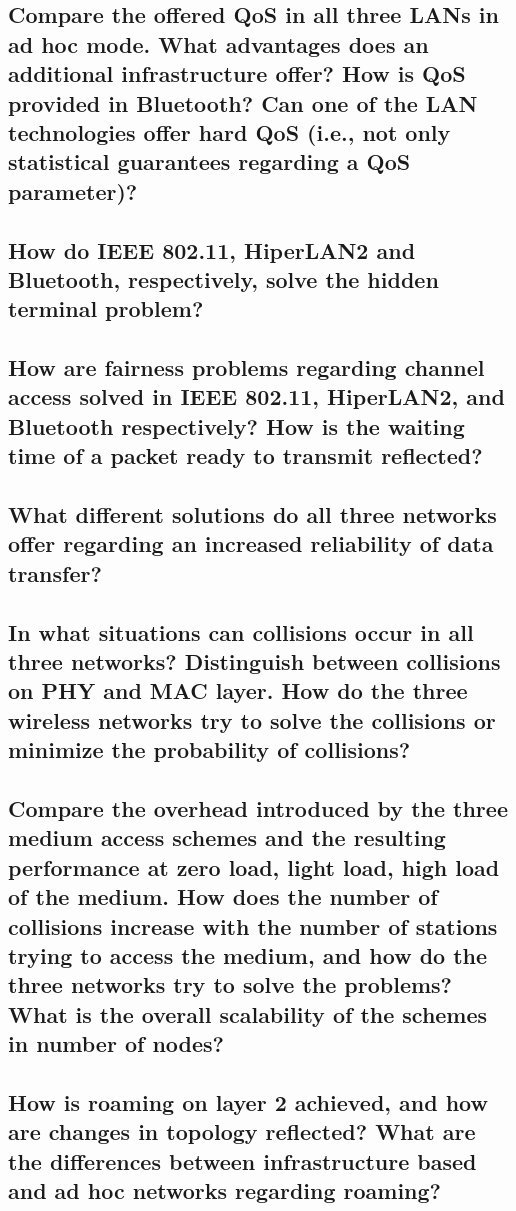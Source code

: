 \subsection{Compare the offered QoS in all three LANs in ad hoc mode. What advantages does
an additional infrastructure offer? How is QoS provided in Bluetooth? Can one of the
LAN technologies offer hard QoS (i.e., not only statistical guarantees regarding a
QoS parameter)?}

\subsection{How do IEEE 802.11, HiperLAN2 and Bluetooth, respectively, solve the hidden
terminal problem?}

\subsection{How are fairness problems regarding channel access solved in IEEE 802.11,
HiperLAN2, and Bluetooth respectively? How is the waiting time of a packet ready to
transmit reflected?}

\subsection{What different solutions do all three networks offer regarding an increased reliability
of data transfer?}

\subsection{In what situations can collisions occur in all three networks? Distinguish between
collisions on PHY and MAC layer. How do the three wireless networks try to solve the
collisions or minimize the probability of collisions?}

\subsection{Compare the overhead introduced by the three medium access schemes and the
resulting performance at zero load, light load, high load of the medium. How does the
number of collisions increase with the number of stations trying to access the
medium, and how do the three networks try to solve the problems? What is the
overall scalability of the schemes in number of nodes?}

\subsection{How is roaming on layer 2 achieved, and how are changes in topology reflected?
What are the differences between infrastructure based and ad hoc networks
regarding roaming?}

